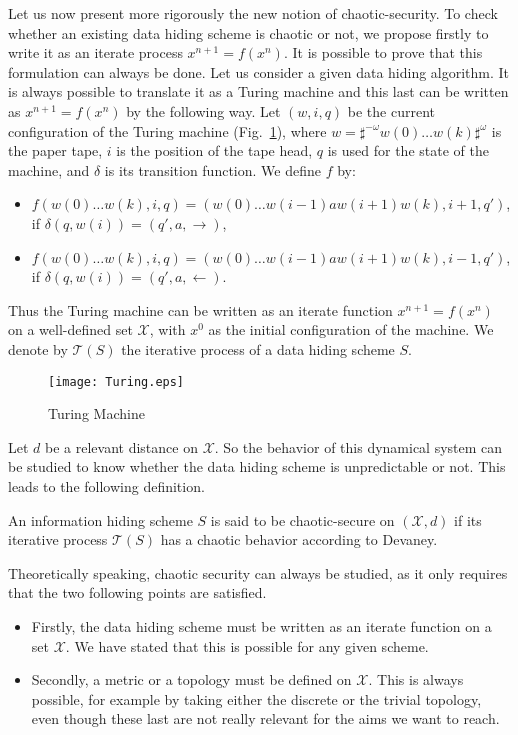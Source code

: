 \documentclass{llncs}
\begin{document}
Let us now present more rigorously the new notion of chaotic-security. To check whether an existing data hiding scheme is chaotic or not, we propose firstly to write it as an iterate process $x^{n+1}=f(x^n)$. It is possible to prove that this formulation can always be done. Let us consider a given data hiding algorithm. It is always possible to translate it as a Turing machine and this last can be written as $x^{n+1} = f(x^n)$ by the following way. Let $(w,i,q)$ be the current configuration of the Turing machine (Fig.~\ref{Turing}), where $w=\sharp^{-\omega} w(0) \hdots w(k)\sharp^{\omega}$ is the paper tape, $i$ is the position of the tape head, $q$ is used for the state of the machine, and $\delta$ is its transition function. We define $f$ by:
\begin{itemize}
\item $f(w(0) \hdots w(k),i,q) = ( w(0) \hdots w(i-1)aw(i+1)w(k),i+1,q')$, \newline if  $\delta(q,w(i)) = (q',a,\rightarrow)$,
\item $f( w(0) \hdots w(k),i,q) = (w(0) \hdots w(i-1)aw(i+1)w(k),i-1,q')$, \newline if $\delta(q,w(i)) = (q',a,\leftarrow)$.
\end{itemize}
Thus the Turing machine can be written as an iterate function $x^{n+1}=f(x^n)$ on a well-defined set $\mathcal{X}$, with $x^0$ as the initial configuration of the machine. We denote by $\mathcal{T}(S)$ the iterative process of a data hiding scheme $S$.

\begin{figure}[h]
  \centering
\texttt{[image: Turing.eps]}
\caption{Turing Machine}
\label{Turing}
\end{figure}



Let $d$ be a relevant distance on $\mathcal{X}$. So the behavior of this dynamical system can be studied to know whether the data hiding scheme is unpredictable or not. This leads to the following definition.

\begin{definition}
An information hiding scheme $S$ is said to be chaotic-secure on $(\mathcal{X},d)$ if its iterative process $\mathcal{T}(S)$ has a chaotic behavior according to Devaney.
\end{definition}

Theoretically speaking, chaotic security can always be studied, as it only requires that the two following points are satisfied.
\begin{itemize}
\item Firstly, the data hiding scheme must be written as an iterate function on a set $\mathcal{X}$. We have stated that this is possible for any given scheme.
\item Secondly, a metric or a topology must be defined on $\mathcal{X}$. This is always possible, for example by taking either the discrete or the trivial topology, even though these last are not really relevant for the aims we want to reach.
\end{itemize}
\end{document}
